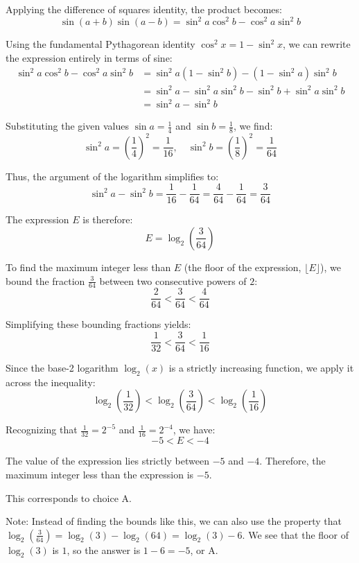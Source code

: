 \begin{enumerate}
 Applying the difference of squares identity, the product becomes:
 \[\sin(a + b)\sin(a - b) = \sin^2 a \cos^2 b - \cos^2 a \sin^2 b\]

 Using the fundamental Pythagorean identity $\cos^2 x = 1 - \sin^2 x$, we can rewrite the expression entirely in terms of sine:\begin{align*}\sin^2 a \cos^2 b - \cos^2 a \sin^2 b &= \sin^2 a (1 - \sin^2 b) - (1 - \sin^2 a)\sin^2 b \\&= \sin^2 a - \sin^2 a \sin^2 b - \sin^2 b + \sin^2 a \sin^2 b \\&= \sin^2 a - \sin^2 b\end{align*}


 
Substituting the given values $\sin a = \frac{1}{4}$ and $\sin b = \frac{1}{8}$, we find:
 \[\sin^2 a = \left(\frac{1}{4}\right)^2 = \frac{1}{16}, \quad \sin^2 b = \left(\frac{1}{8}\right)^2 = \frac{1}{64}\]

 Thus, the argument of the logarithm simplifies to:
 \[\sin^2 a - \sin^2 b = \frac{1}{16} - \frac{1}{64} = \frac{4}{64} - \frac{1}{64} = \frac{3}{64}\]

 The expression $E$ is therefore:
 \[E = \log_2 \left( \frac{3}{64} \right)\]

 
To find the maximum integer less than $E$ (the floor of the expression, $\lfloor E \rfloor$), we bound the fraction $\frac{3}{64}$ between two consecutive powers of $2$:
 \[\frac{2}{64} < \frac{3}{64} < \frac{4}{64}\]

 Simplifying these bounding fractions yields:
 \[\frac{1}{32} < \frac{3}{64} < \frac{1}{16}\]

 Since the base-2 logarithm $\log_2(x)$ is a strictly increasing function, we apply it across the inequality:
 \[\log_2 \left( \frac{1}{32} \right) < \log_2 \left( \frac{3}{64} \right) < \log_2 \left( \frac{1}{16} \right)\]

 Recognizing that $\frac{1}{32} = 2^{-5}$ and $\frac{1}{16} = 2^{-4}$, we have:
 \[-5 < E < -4\]

 
The value of the expression lies strictly between $-5$ and $-4$. Therefore, the maximum integer less than the expression is $-5$. 

 This corresponds to choice $\boxed{\text{A}}$.

 Note: Instead of finding the bounds like this, we can also use the property that $\log_2 (\frac{3}{64}) = \log_2 (3) - \log_2(64) = \log_2 (3) - 6$. We see that the floor of $\log_2 (3)$ is $1$, so the answer is $1-6=-5$, or $\boxed{\text{A}}$.


\end{enumerate}
